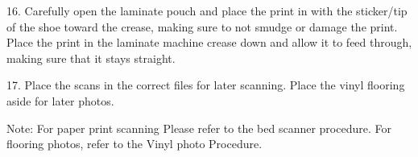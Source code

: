16. Carefully open the laminate pouch and place the print in with the sticker/tip of the shoe toward the crease, making sure to not smudge or damage the print. Place the print in the laminate machine crease down and allow it to feed through, making sure that it stays straight. 



17. Place the scans in the correct files for later scanning. Place the vinyl flooring aside for later photos. 

Note: For paper print scanning Please refer to the bed scanner procedure. For flooring photos, refer to the Vinyl photo Procedure. 

